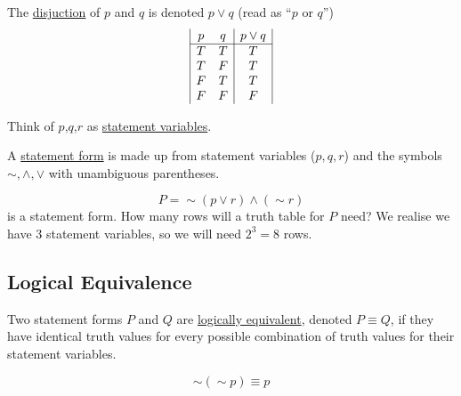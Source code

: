 \newpage
\begin{definition}The \underline{disjuction} of $p$ and $q$ is denoted $p \lor q$ (read as ``$p$ or $q$'')$$\begin{array}{|c c|c|}
p & q & p\lor q \\
\hline
T & T & T \\
T & F & T \\
F & T & T \\
F & F & F
\end{array}$$\end{definition}



Think of $p$,$q$,$r$ as \underline{statement variables}.

\begin{definition}
    A \underline{statement form} is made up from statement variables ($p,q,r$) and the symbols $\sim , \land, \lor$ with unambiguous parentheses.
\end{definition}

\begin{example}
    $$P = \sim \left(p\lor r\right)\land\left(\sim r\right)$$ is a statement form. How many rows will a truth table for $P$ need? We realise we have 3 statement variables, so we will need $2^3 = 8$ rows.
\end{example}


\subsection{Logical Equivalence}
\begin{definition}
    Two statement forms $P$ and $Q$ are \underline{logically equivalent}, denoted $P\equiv Q$, if they have identical truth values for every possible combination of truth values for their statement variables.
\end{definition}

\begin{example}
    $$\sim\left(\sim p\right) \equiv p$$
\end{example}

